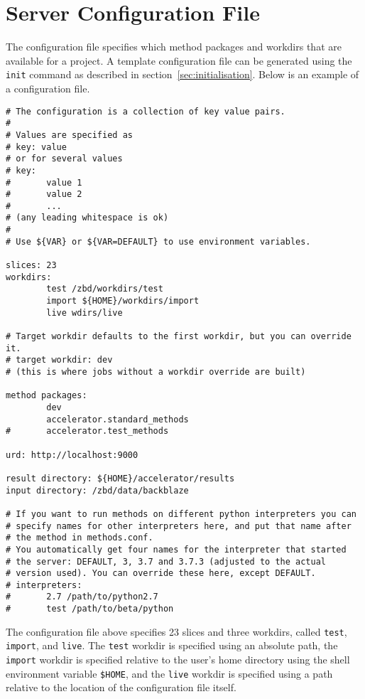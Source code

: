 \section{Server Configuration File}
\label{sec:configfile}
The configuration file specifies which method packages and workdirs
that are available for a project.  A template configuration file can
be generated using the \texttt{init} command as described in
section~\ref{sec:initialisation}.  Below is an example of a configuration file.
\begin{snugshade}
\begin{verbatim}
# The configuration is a collection of key value pairs.
#
# Values are specified as
# key: value
# or for several values
# key:
#       value 1
#       value 2
#       ...
# (any leading whitespace is ok)
#
# Use ${VAR} or ${VAR=DEFAULT} to use environment variables.

slices: 23
workdirs:
        test /zbd/workdirs/test
        import ${HOME}/workdirs/import
        live wdirs/live

# Target workdir defaults to the first workdir, but you can override it.
# target workdir: dev
# (this is where jobs without a workdir override are built)

method packages:
        dev
        accelerator.standard_methods
#       accelerator.test_methods   

urd: http://localhost:9000

result directory: ${HOME}/accelerator/results
input directory: /zbd/data/backblaze

# If you want to run methods on different python interpreters you can
# specify names for other interpreters here, and put that name after
# the method in methods.conf.
# You automatically get four names for the interpreter that started
# the server: DEFAULT, 3, 3.7 and 3.7.3 (adjusted to the actual
# version used). You can override these here, except DEFAULT.
# interpreters:
#       2.7 /path/to/python2.7
#       test /path/to/beta/python  
\end{verbatim}
\end{snugshade}%

The configuration file above specifies 23 slices and three workdirs,
called \texttt{test}, \texttt{import}, and \texttt{live}.  The
\texttt{test} workdir is specified using an absolute path, the
\texttt{import} workdir is specified relative to the user's home
directory using the shell environment variable \texttt{\$HOME}, and
the \texttt{live} workdir is specified using a path relative to
the location of the configuration file itself.

